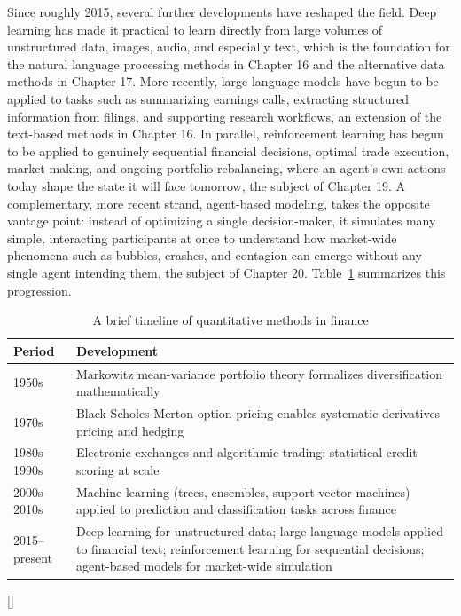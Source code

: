 \documentclass[../ai_in_finance]{subfiles}
\begin{document}
Since roughly 2015, several further developments have reshaped the field. Deep learning has made it practical to learn directly from large volumes of unstructured data, images, audio, and especially text, which is the foundation for the natural language processing methods in Chapter 16 and the alternative data methods in Chapter 17. More recently, large language models have begun to be applied to tasks such as summarizing earnings calls, extracting structured information from filings, and supporting research workflows, an extension of the text-based methods in Chapter 16. In parallel, reinforcement learning has begun to be applied to genuinely sequential financial decisions, optimal trade execution, market making, and ongoing portfolio rebalancing, where an agent's own actions today shape the state it will face tomorrow, the subject of Chapter 19. A complementary, more recent strand, agent-based modeling, takes the opposite vantage point: instead of optimizing a single decision-maker, it simulates many simple, interacting participants at once to understand how market-wide phenomena such as bubbles, crashes, and contagion can emerge without any single agent intending them, the subject of Chapter 20. Table~\ref{tab:history_timeline} summarizes this progression.

\begin{table}[htbp]
\centering
\begin{lrbox}{\bookmeasuredbox}
\begin{tabular}{p{2.4cm}p{9.6cm}}
\toprule
Period & Development \\
\midrule
1950s & Markowitz mean-variance portfolio theory formalizes diversification mathematically \\
1970s & Black-Scholes-Merton\index{Black-Scholes-Merton model} option pricing enables systematic derivatives pricing and hedging \\
1980s--1990s & Electronic exchanges and algorithmic trading; statistical credit scoring at scale \\
2000s--2010s & Machine learning (trees, ensembles, support vector machines) applied to prediction and classification tasks across finance \\
2015--present & Deep learning for unstructured data; large language models applied to financial text; reinforcement learning for sequential decisions; agent-based models for market-wide simulation \\
\bottomrule
\end{tabular}
\end{lrbox}
\ifdim\wd\bookmeasuredbox<0.65\linewidth
\setlength{\bookcapwidth}{0.65\linewidth}
\else
\setlength{\bookcapwidth}{\wd\bookmeasuredbox}
\fi
{}[\bookcapwidth]{
\usebox{\bookmeasuredbox}
}{
\caption{A brief timeline of quantitative methods in finance}
\label{tab:history_timeline}
}
\end{table}
\end{document}

